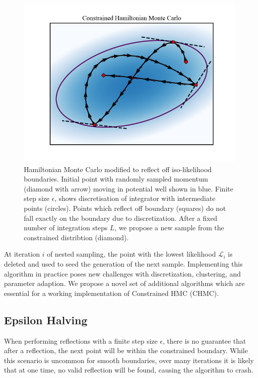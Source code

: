 \documentclass[11pt]{article}
\begin{document}
    \begin{figure}[t!]
        \center
        \includegraphics[width=\linewidth]{../figures/ConstrainedHMC}
        \caption{
        Hamiltonian Monte Carlo modified to reflect off iso-likelihood boundaries. Initial point with randomly sampled
        momentum (diamond with arrow) moving in potential well shown in blue. Finite step size $\epsilon$, shows discretisation of
        integrator with intermediate points (circles). Points which reflect off boundary (squares) do not fall exactly on
        the boundary due to discretization. After a fixed number of integration steps $L$, we propose a new sample from the
        constrained distribtion (diamond).
        }\label{fig:constrainedhmc}
    \end{figure}

    At iteration $i$ of nested sampling, the point with the lowest likelihood $\mathcal{L}_i$ is deleted and used to
    seed the generation of the next sample.
    Implementing this algorithm in practice poses new challenges with discretization, clustering, and parameter adaption.
    We propose a novel set of additional algorithms which are essential for a working implementation of
    Constrained HMC (CHMC).

    \subsection{Epsilon Halving}
    When performing reflections with a finite step size $\epsilon$, there is no guarantee that after a reflection,
    the next point will be within the constrained boundary.
    While this scenario is uncommon for smooth boundaries, over many iterations it is likely that at one time,
    no valid reflection will be found, causing the algorithm to crash.
\end{document}
